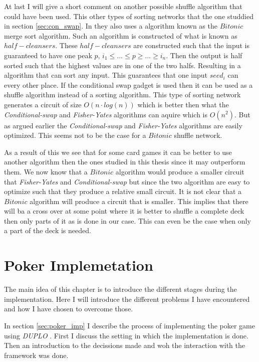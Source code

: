 \documentclass[twoside,11pt,openright]{report}
\newcommand{\FY}{\textit{Fisher-Yates} }
\newcommand{\CS}{\textit{Conditional-swap} }
\newcommand{\DUPLO}{\textit{DUPLO} }
\begin{document}
\bigskip

At last I will give a short comment on another possible shuffle algorithm that could have been used. This other types of sorting networks that the one studdied in section \ref{sec:con_swap}. In \cite{psi} they also uses a algorithm known as the $Bitonic$ merge sort algorithm. Such an algorithm is constructed of what is known as $half-cleansers$. These $half-cleansers$ are constructed such that the input is guaranteed to have one peak $p$, $i_1\leq \dots \leq p \geq \dots \geq i_n$. Then the output is half sorted such that the highest values are in one of the two halfs. Resulting in a algorithm that can sort any input. This guarantees that one input $seed_i$ can every other place. If the conditional swap gadget is used then it can be used as a shuffle algorithm instead of a sorting algorithm. This type of sorting network generates a circuit of size $O(n\cdot log(n))$ which is better then what the \CS and \FY algorithms can aquire which is $O(n^2)$. But as argued earlier the \CS and \FY algorithms are easily optimized. This seems not to be the case for a $Bitonic$ shuffle network.

As a result of this we see that for some card games it can be better to use another algorithm then the ones studied in this thesis since it may outperform them. We now know that a $Bitonic$ algorithm would produce a smaller circuit that \FY and \CS but since the two algorithm are easy to optimize such that they produce a relative small circuit. It is not clear that a $Bitonic$ algorithm will produce a circuit that is smaller. This implies that there will ba a cross over at some point where it is better to shuffle a complete deck then only parts of it as is done in our case. This can even be the case when only a part of the deck is needed.


\chapter{Poker Implemetation}
\label{ch:implementation}
The main idea of this chapter is to introduce the different stages during the implementation. Here I will introduce the different problems I have encountered and how I have chosen to overcome those.

In section \ref{sec:poker_imp} I describe the process of implementing the poker game using \DUPLO. First I discuss the setting in which the implementation is done. Then an introduction to the decissions made and woh the interaction with the framework was done.
\end{document}
